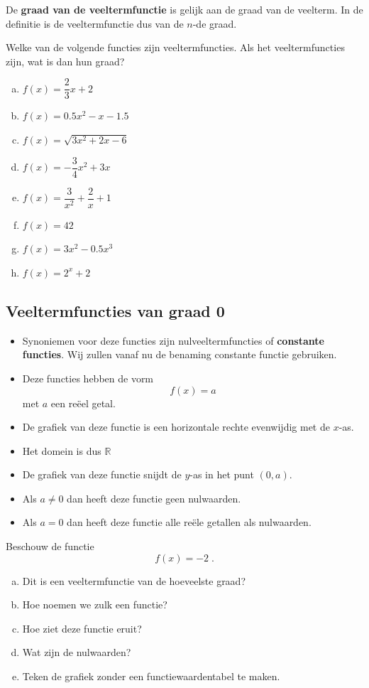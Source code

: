 \documentclass[12pt]{article}
\begin{document}
De {\bf graad van de veeltermfunctie} is gelijk aan de graad van de veelterm. In de definitie is de veeltermfunctie dus van de $n$-de graad.

\begin{oefening}
Welke van de volgende functies zijn veeltermfuncties. Als het veeltermfuncties zijn, wat is dan hun graad?
\begin{enumerate}[(a)]
  \itemsep1em
  \item $f(x)=\dfrac{2}{3}x+2$
  \item $f(x)=0.5x^2-x-1.5$
  \item $f(x)=\sqrt{3x^2+2x-6}$
  \item $f(x)=-\dfrac{3}{4}x^2+3x$
  \item $f(x)=\dfrac{3}{x^2}+\dfrac{2}{x}+1$
  \item $f(x)=42$
  \item $f(x)=3x^2-0.5x^3$
  \item $f(x)=2^x+2$
\end{enumerate}
\end{oefening}

\pagebreak
\subsection{Veeltermfuncties van graad 0}

\begin{itemize}
  \item Synoniemen voor deze functies zijn nulveeltermfuncties of {\bf constante functies}. Wij zullen vanaf nu de benaming constante functie gebruiken.
  \item Deze functies hebben de vorm
  $$f(x) = a$$
  met $a$ een reëel getal.
  \item De grafiek van deze functie is een horizontale rechte evenwijdig met de $x$-as.
  \item Het domein is dus $\mathbb{R}$
  \item De grafiek van deze functie snijdt de $y$-as in het punt $(0, a)$.
  \item Als $a\neq 0$ dan heeft deze functie geen nulwaarden.
  \item Als $a=0$ dan heeft deze functie alle reële getallen als nulwaarden.
\end{itemize}

\begin{oefening}
Beschouw de functie 
$$f(x)=-2\;.$$
\begin{enumerate}[(a)]
  \item Dit is een veeltermfunctie van de hoeveelste graad?
  \item Hoe noemen we zulk een functie?
  \item Hoe ziet deze functie eruit?
  \item Wat zijn de nulwaarden?
  \item Teken de grafiek zonder een functiewaardentabel te maken.
\end{enumerate}
\end{oefening}
\end{document}
